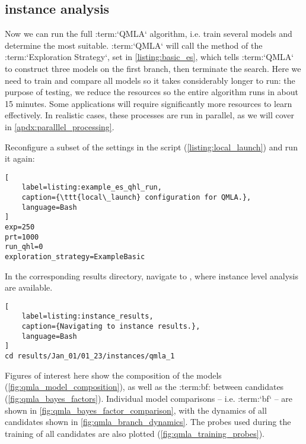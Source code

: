 \subsection{instance analysis}
Now we can run the full :term:`QMLA` algorithm, i.e. train several models 
    and determine the most suitable. 
:term:`QMLA` will call the  method of the  :term:`Exploration Strategy`,
    set in \cref{listing:basic_es}, which tells :term:`QMLA` to construct three models
    on the first branch, then terminate the search.
Here we need to train and compare all models so it takes considerably longer to run:
    the purpose of testing, we reduce the resources so the entire algorithm runs in about 15 minutes.
Some applications will require significantly more resources to learn effectively.
In realistic cases, these processes are run in parallel, as we will cover in \cref{apdx:paralllel_processing}.
\par 

Reconfigure a subset of the settings in the  script (\cref{listing:local_launch}) and run it again:
\begin{lstlisting}[
    label=listing:example_es_qhl_run,
    caption={\ttt{local\_launch} configuration for QMLA.},
    language=Bash
]
exp=250
prt=1000
run_qhl=0
exploration_strategy=ExampleBasic
\end{lstlisting}

\par 

In the corresponding results directory, navigate to , where instance level analysis are available. 

\begin{lstlisting}[
    label=listing:instance_results,
    caption={Navigating to instance results.},
    language=Bash
]
cd results/Jan_01/01_23/instances/qmla_1
\end{lstlisting}

Figures of interest here show the composition of the models (\cref{fig:qmla_model_composition}), 
    as well as the :term:bf: between candidates (\cref{fig:qmla_bayes_factors}). 
Individual model comparisons -- i.e. :term:`bf` -- 
    are shown in \cref{fig:qmla_bayes_factor_comparison}, 
    with the dynamics of all candidates shown in \cref{fig:qmla_branch_dynamics}. 
The probes used during the training of all candidates are also plotted  (\cref{fig:qmla_training_probes}).

